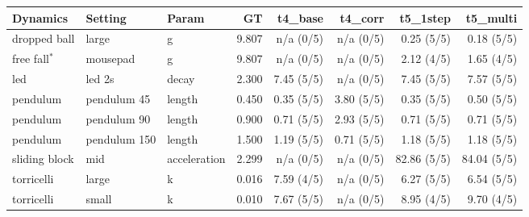\begin{tabular}{lll r r r r r}
\toprule
Dynamics & Setting & Param & GT & t4_base & t4_corr & t5_1step & t5_multi \\
\midrule
dropped ball & large & g & 9.807 & n/a (0/5) & n/a (0/5) & 0.25 (5/5) & 0.18 (5/5) \\
free fall$^\ast$ & mousepad & g & 9.807 & n/a (0/5) & n/a (0/5) & 2.12 (4/5) & 1.65 (4/5) \\
led & led 2s & decay & 2.300 & 7.45 (5/5) & n/a (0/5) & 7.45 (5/5) & 7.57 (5/5) \\
pendulum & pendulum 45 & length & 0.450 & 0.35 (5/5) & 3.80 (5/5) & 0.35 (5/5) & 0.50 (5/5) \\
pendulum & pendulum 90 & length & 0.900 & 0.71 (5/5) & 2.93 (5/5) & 0.71 (5/5) & 0.71 (5/5) \\
pendulum & pendulum 150 & length & 1.500 & 1.19 (5/5) & 0.71 (5/5) & 1.18 (5/5) & 1.18 (5/5) \\
sliding block & mid & acceleration & 2.299 & n/a (0/5) & n/a (0/5) & 82.86 (5/5) & 84.04 (5/5) \\
torricelli & large & k & 0.016 & 7.59 (4/5) & n/a (0/5) & 6.27 (5/5) & 6.54 (5/5) \\
torricelli & small & k & 0.010 & 7.67 (5/5) & n/a (0/5) & 8.95 (4/5) & 9.70 (4/5) \\
\bottomrule
\end{tabular}
